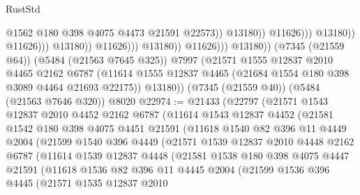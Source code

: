 \begin{lexlean}{RustStd}
\begin{coremodule}
                                                      @1562
                                                      @180
                                                      @398
                                                      @4075
                                                      @4473
                                                      @21591
                                                      @22573))
                                                  @13180))
                                              @11626)))
                                        @13180))
                                    @11626)))
                              @13180))
                          @11626)))
                    @13180))
                @11626)))
          @13180))
      (@7345 (@21559 @64))
      (@5484 (@21563 @7645 @325))
      @7997
      (@21571
        @1555
        @12837
        @2010
        @4465
        @2162
        @6787
        (@11614 @1555 @12837 @4465 (@21684 @1554 @180 @398 @3089 @4464 @21693 @22175))
        @13180))
    (@7345 (@21559 @40))
    (@5484 (@21563 @7646 @320))
    @8020
@22974 := @21433
    (@22797
      (@21571
        @1543
        @12837
        @2010
        @4452
        @2162
        @6787
        (@11614
          @1543
          @12837
          @4452
          (@21581
            @1542
            @180
            @398
            @4075
            @4451
            @21591
            (@11618
              @1540
              @82
              @396
              @11
              @4449
              @2004
              (@21599
                @1540
                @396
                @4449
                (@21571
                  @1539
                  @12837
                  @2010
                  @4448
                  @2162
                  @6787
                  (@11614
                    @1539
                    @12837
                    @4448
                    (@21581
                      @1538
                      @180
                      @398
                      @4075
                      @4447
                      @21591
                      (@11618
                        @1536
                        @82
                        @396
                        @11
                        @4445
                        @2004
                        (@21599
                          @1536
                          @396
                          @4445
                          (@21571
                            @1535
                            @12837
                            @2010

\end{coremodule}
\end{lexlean}
